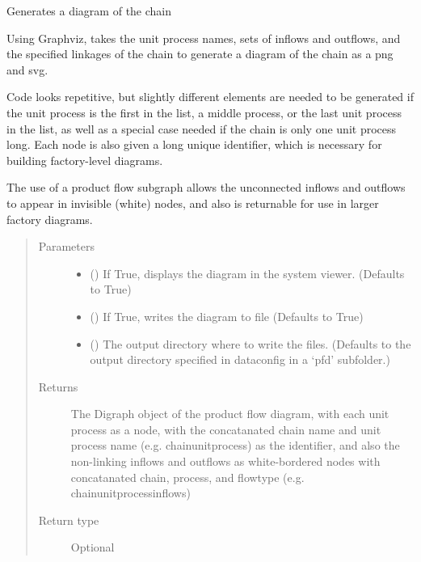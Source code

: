 \documentclass[a4paper,10pt,english]{sphinxmanual}
\begin{document}
\begin{fulllineitems}
\label{\detokenize{chain:processchain.ProductChain.diagram}}
Generates a diagram of the chain

Using Graphviz, takes the unit process names, sets of inflows and
outflows, and the specified linkages of the chain to generate a
diagram of the chain as a png and svg.

Code looks repetitive, but slightly different elements are needed to
be generated if the unit process is the first in the list, a middle
process, or the last unit process in the list, as well as a special
case needed if the chain is only one unit process long. Each node is
also given a long unique identifier, which is necessary for building
factory-level diagrams.

The use of a product flow subgraph allows the unconnected inflows and
outflows to appear in invisible (white) nodes, and also is returnable
for use in larger factory diagrams.
\begin{quote}\begin{description}
\item[{Parameters}] \leavevmode\begin{itemize}
\item {} 
 () \textendash{} If True, displays the diagram in the system
viewer.
(Defaults to True)

\item {} 
 () \textendash{} If True, writes the diagram to file
(Defaults to True)

\item {} 
 () \textendash{} The output directory where to write the files.
(Defaults to the output directory specified in dataconfig in
a ‘pfd’ subfolder.)

\end{itemize}

\item[{Returns}] \leavevmode
The Digraph object of the product flow diagram, with each
unit process as a node, with the concatanated chain name and
unit process name (e.g. chainunitprocess) as the identifier,
and also the non-linking inflows and outflows as white-bordered
nodes with concatanated chain, process, and flowtype (e.g.
chainunitprocessinflows)

\item[{Return type}] \leavevmode
Optional

\end{description}\end{quote}

\end{fulllineitems}
\end{document}
